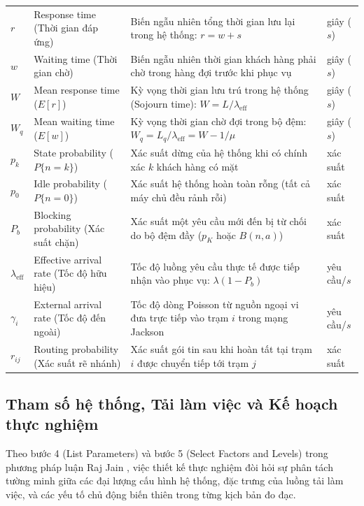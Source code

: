 \begin{xltabular}{\linewidth}{@{} >{\centering\arraybackslash}p{1.6cm} >{\raggedright\arraybackslash}p{6.25cm} >{\raggedright\arraybackslash}X >{\centering\arraybackslash}p{1.6cm} @{}}
$r$ & Response time (Thời gian đáp ứng) & Biến ngẫu nhiên tổng thời gian lưu lại trong hệ thống: $r = w + s$ & giây ($s$) \\
$w$ & Waiting time (Thời gian chờ) & Biến ngẫu nhiên thời gian khách hàng phải chờ trong hàng đợi trước khi phục vụ & giây ($s$) \\
$W$ & Mean response time ($E[r]$) & Kỳ vọng thời gian lưu trú trong hệ thống (Sojourn time): $W = L / \lambda_{\text{eff}}$ & giây ($s$) \\
$W_q$ & Mean waiting time ($E[w]$) & Kỳ vọng thời gian chờ đợi trong bộ đệm: $W_q = L_q / \lambda_{\text{eff}} = W - 1/\mu$ & giây ($s$) \\
$p_k$ & State probability ($P\{n = k\}$) & Xác suất dừng của hệ thống khi có chính xác $k$ khách hàng có mặt & xác suất \\
$p_0$ & Idle probability ($P\{n = 0\}$) & Xác suất hệ thống hoàn toàn rỗng (tất cả máy chủ đều rảnh rỗi) & xác suất \\
$P_b$ & Blocking probability (Xác suất chặn) & Xác suất một yêu cầu mới đến bị từ chối do bộ đệm đầy ($p_K$ hoặc $B(n,a)$) & xác suất \\
$\lambda_{\text{eff}}$ & Effective arrival rate (Tốc độ hữu hiệu) & Tốc độ luồng yêu cầu thực tế được tiếp nhận vào phục vụ: $\lambda(1 - P_b)$ & yêu cầu/$s$ \\
$\gamma_i$ & External arrival rate (Tốc độ đến ngoài) & Tốc độ dòng Poisson từ nguồn ngoại vi đưa trực tiếp vào trạm $i$ trong mạng Jackson & yêu cầu/$s$ \\
$r_{ij}$ & Routing probability (Xác suất rẽ nhánh) & Xác suất gói tin sau khi hoàn tất tại trạm $i$ được chuyển tiếp tới trạm $j$ & xác suất \\
\end{xltabular}
\endgroup
\subsection{Tham số hệ thống, Tải làm việc và Kế hoạch thực nghiệm}
\label{subsec:tham-so-yeu-to}

\hspace{0.5cm}Theo bước 4 (List Parameters) và bước 5 (Select Factors and Levels) trong phương pháp luận Raj Jain \cite{ref_jain}, việc thiết kế thực nghiệm đòi hỏi sự phân tách tường minh giữa các đại lượng cấu hình hệ thống, đặc trưng của luồng tải làm việc, và các yếu tố chủ động biến thiên trong từng kịch bản đo đạc.

